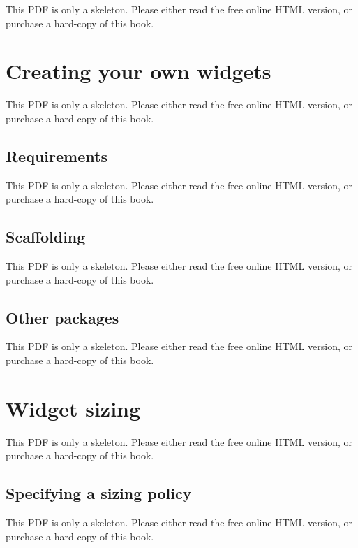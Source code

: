 \documentclass[
  11pt,
]{krantz}
\theoremstyle{definition}
\theoremstyle{definition}
\theoremstyle{definition}
\theoremstyle{definition}
\theoremstyle{remark}
\begin{document}
This PDF is only a skeleton. Please either read the free online HTML version, or purchase a hard-copy of this book.

\section{Creating your own widgets}\label{htmlwidgets-create}

This PDF is only a skeleton. Please either read the free online HTML version, or purchase a hard-copy of this book.

\subsection{Requirements}\label{requirements}

This PDF is only a skeleton. Please either read the free online HTML version, or purchase a hard-copy of this book.

\subsection{Scaffolding}\label{scaffolding}

This PDF is only a skeleton. Please either read the free online HTML version, or purchase a hard-copy of this book.

\subsection{Other packages}\label{other-packages}

This PDF is only a skeleton. Please either read the free online HTML version, or purchase a hard-copy of this book.

\section{Widget sizing}\label{htmlwidgets-size}

This PDF is only a skeleton. Please either read the free online HTML version, or purchase a hard-copy of this book.

\subsection{Specifying a sizing policy}\label{specifying-a-sizing-policy}

This PDF is only a skeleton. Please either read the free online HTML version, or purchase a hard-copy of this book.
\end{document}
